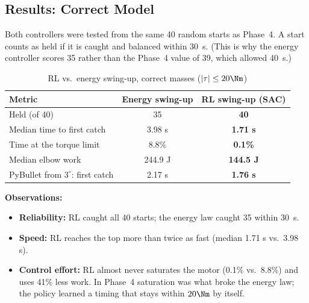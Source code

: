 \subsection{Results: Correct Model}
Both controllers were tested from the same 40 random starts as Phase~4. A start counts as held if it is caught and balanced within 30~s. (This is why the energy controller scores 35 rather than the Phase~4 value of 39, which allowed 40~s.)
\begin{table}[H]
\centering
\caption{RL vs.\ energy swing-up, correct masses ($|\tau|\le20\Nm$)}
\label{tab:rlnom}
\begin{tabular}{|l|c|c|}
\hline
Metric & Energy swing-up & RL swing-up (SAC)\\ \hline
Held (of 40) & 35 & \textbf{40}\\
Median time to first catch & 3.98 s & \textbf{1.71 s}\\
Time at the torque limit & 8.8\% & \textbf{0.1\%}\\
Median elbow work & 244.9 J & \textbf{144.5 J}\\
PyBullet from $3^\circ$: first catch & 2.17 s & \textbf{1.76 s}\\ \hline
\end{tabular}
\end{table}
\textbf{Observations:}
\begin{itemize}
\item \textbf{Reliability:} RL caught all 40 starts; the energy law caught 35 within 30~s.
\item \textbf{Speed:} RL reaches the top more than twice as fast (median 1.71 s vs.\ 3.98 s).
\item \textbf{Control effort:} RL almost never saturates the motor (0.1\% vs.\ 8.8\%) and uses 41\% less work. In Phase~4 saturation was what broke the energy law; the policy learned a timing that stays within $20\Nm$ by itself.
\end{itemize}

